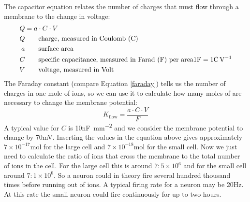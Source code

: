 The capacitor equation relates the number of charges that must flow through a membrane to the change in voltage:
\begin{align*}
Q &= a \cdot C \cdot V \\
Q &\qquad \text{charge, measured in Coulomb (\si{\coulomb})} \\
a &\qquad \text{surface area} \\
C &\qquad \text{specific capacitance, measured in Farad (\si{\farad}) per area} 1\si{\farad} = 1 \si{\coulomb\per\volt}\\
V &\qquad \text{voltage, measured in Volt}
\end{align*}
The Faraday constant (compare Equation \ref{faraday}) tells us the number of charges in one mole of ions, so we can use it to calculate how many moles of  are necessary to change the membrane potential:
\begin{equation*}
K_\mathrm{flow} = \frac{a \cdot C \cdot V}{F}
\end{equation*}
A typical value for $C$ is 10\si{\nano\farad\per\square\milli\meter} and we consider the membrane potential to change by 70\si{mV}. Inserting the values in the equation above gives approximately $7 \times 10^{-17}\si{\mole}$ for the large cell and $7 \times 10^{-18}\si{\mole}$ for the small cell. Now we just need to calculate the ratio of ions that cross the membrane to the total number of ions in the cell. For the large cell this is around $7:5\times 10^6$ and for the small cell around $7:1\times 10^6$. So a neuron could in theory fire several hundred thousand times before running out of ions. A typical firing rate for a neuron may be 20\si{\hertz}. At this rate the small neuron could fire continuously for up to two hours.